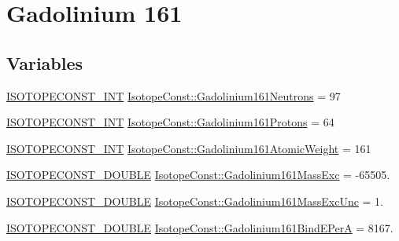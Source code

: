 \hypertarget{group___isotope_const-_gadolinium-_gd161}{}\section{Gadolinium 161}
\label{group___isotope_const-_gadolinium-_gd161}
\subsection*{Variables}
\begin{DoxyCompactItemize}
\item 
\mbox{\hyperlink{group___isotope_const-_macros_ga5f18360b3e99483a35c32d789e62621c}{I\+S\+O\+T\+O\+P\+E\+C\+O\+N\+S\+T\+\_\+\+I\+NT}} \mbox{\hyperlink{group___isotope_const-_gadolinium-_gd161_ga1596b934a0c984cea5d98f8467fef09e}{Isotope\+Const\+::\+Gadolinium161\+Neutrons}} = 97
\item 
\mbox{\hyperlink{group___isotope_const-_macros_ga5f18360b3e99483a35c32d789e62621c}{I\+S\+O\+T\+O\+P\+E\+C\+O\+N\+S\+T\+\_\+\+I\+NT}} \mbox{\hyperlink{group___isotope_const-_gadolinium-_gd161_gaa987c972c1c3dfb37872afa54e46f72d}{Isotope\+Const\+::\+Gadolinium161\+Protons}} = 64
\item 
\mbox{\hyperlink{group___isotope_const-_macros_ga5f18360b3e99483a35c32d789e62621c}{I\+S\+O\+T\+O\+P\+E\+C\+O\+N\+S\+T\+\_\+\+I\+NT}} \mbox{\hyperlink{group___isotope_const-_gadolinium-_gd161_gaf1b35cd513046eef80c6f1a1b223c747}{Isotope\+Const\+::\+Gadolinium161\+Atomic\+Weight}} = 161
\item 
\mbox{\hyperlink{group___isotope_const-_macros_ga8f45a7272ce02c0b4c65c44636ed719a}{I\+S\+O\+T\+O\+P\+E\+C\+O\+N\+S\+T\+\_\+\+D\+O\+U\+B\+LE}} \mbox{\hyperlink{group___isotope_const-_gadolinium-_gd161_ga3dbc60db72d9eb18e3264f8dfbe744fc}{Isotope\+Const\+::\+Gadolinium161\+Mass\+Exc}} = -\/65505.
\item 
\mbox{\hyperlink{group___isotope_const-_macros_ga8f45a7272ce02c0b4c65c44636ed719a}{I\+S\+O\+T\+O\+P\+E\+C\+O\+N\+S\+T\+\_\+\+D\+O\+U\+B\+LE}} \mbox{\hyperlink{group___isotope_const-_gadolinium-_gd161_ga9a40c77c3993e308690423bb4c05dbd7}{Isotope\+Const\+::\+Gadolinium161\+Mass\+Exc\+Unc}} = 1.
\item 
\mbox{\hyperlink{group___isotope_const-_macros_ga8f45a7272ce02c0b4c65c44636ed719a}{I\+S\+O\+T\+O\+P\+E\+C\+O\+N\+S\+T\+\_\+\+D\+O\+U\+B\+LE}} \mbox{\hyperlink{group___isotope_const-_gadolinium-_gd161_ga13ef09894971be97b52d458a14ae7154}{Isotope\+Const\+::\+Gadolinium161\+Bind\+E\+PerA}} = 8167.

\end{DoxyCompactItemize}
